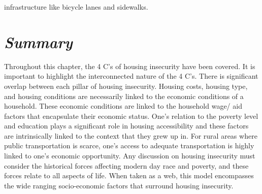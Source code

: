 infrastructure like bicycle lanes and sidewalks.  

\section{\textit{Summary}}
Throughout this chapter, the 4 C's of housing insecurity have been covered. It is important to highlight the interconnected nature of the 4 C's. There is significant overlap between each pillar of housing insecurity. Housing costs, housing type, and housing conditions are necessarily linked to the economic conditions of a household. These economic conditions are linked to the household wage/ aid factors that encapsulate their economic status. One's relation to the poverty level and education plays a significant role in housing accessibility and these factors are intrinsically linked to the context that they grew up in.  For rural areas where public transportation is scarce, one's access to adequate transportation is highly linked to one's economic opportunity. Any discussion on housing insecurity must consider the historical forces affecting modern day race and poverty, and these forces relate to all aspects of life. When taken as a web, this model encompasses the wide ranging socio-economic factors that surround housing insecurity. 
\endinput